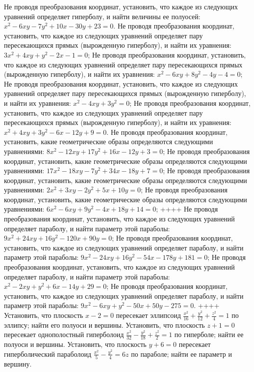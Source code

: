 Не проводя преобразования координат, установить, что каждое из следующих уравнений определяет гиперболу, и найти величины ее полуосей: $x^2-6 x y-7 y^2+10 x-30 y+23=0$.
Не проводя преобразования координат, установить, что каждое из следующих уравнений определяет пару пересекающихся прямых (вырожденную гиперболу), и найти их уравнения: $3 x^2+4 x y+y^2-2 x-1=0$;
Не проводя преобразования координат, установить, что каждое из следующих уравнений определяет пару пересекающихся прямых (вырожденную гиперболу), и найти их уравнения: $x^2-6 x y+8 y^2-4 y-4=0$;
Не проводя преобразования координат, установить, что каждое из следующих уравнений определяет пару пересекающихся прямых (вырожденную гиперболу), и найти их уравнения: $x^2-4 x y+3 y^2=0$;
Не проводя преобразования координат, установить, что каждое из следующих уравнений определяет пару пересекающихся прямых (вырожденную гиперболу), и найти их уравнения: $x^2+4 x y+3 y^2-6 x-12 y+9=0$.
Не проводя преобразования координат, установить, какие геометрические образы определяются следующими уравнениями: $8 x^2-12 x y+17 y^2+16 x-12 y+3=0$;
Не проводя преобразования координат, установить, какие геометрические образы определяются следующими уравнениями: $17 x^2-18 x y-7 y^2+34 x-18 y+7=0$;
Не проводя преобразования координат, установить, какие геометрические образы определяются следующими уравнениями: $2 x^2+3 x y-2 y^2+5 x+10 y=0$;
Не проводя преобразования координат, установить, какие геометрические образы определяются следующими уравнениями: $6 x^2-6 x y+9 y^2-4 x+18 y+14=0$;
++++
Не проводя преобразования координат, установить, что каждое из следующих уравнений определяет параболу, и найти параметр этой параболы: $9 x^2+24 x y+16 y^2-120 x+90 y=0$;
Не проводя преобразования координат, установить, что каждое из следующих уравнений определяет параболу, и найти параметр этой параболы: $9 x^2-24 x y+16 y^2-54 x-178 y+181=0$;
Не проводя преобразования координат, установить, что каждое из следующих уравнений определяет параболу, и найти параметр этой параболы: $x^2-2 x y+y^2+6 x-14 y+29=0$;
Не проводя преобразования координат, установить, что каждое из следующих уравнений определяет параболу, и найти параметр этой параболы: $9 x^2-6 x y+y^2-50 x+50 y-275=0$.
++++
Установить, что плоскость $x-2=0$ пересекает эллипсоид $\frac{x^2}{16}+\frac{y^2}{12}+\frac{z^2}{4}=1$ по эллипсу; найти его полуоси и вершины.
Установить, что плоскость $z+1=0$ пересекает однополостный гиперболоид $\frac{x^2}{32}-\frac{y^2}{18}+\frac{z^2}{2}=1$ по гиперболе; найти ее полуоси и вершины.
Установить, что плоскость $y+6=0$ пересекает гиперболический параболоид $\frac{x^2}{5}-\frac{y^2}{4}=6 z$ по параболе; найти ее параметр и вершину.
